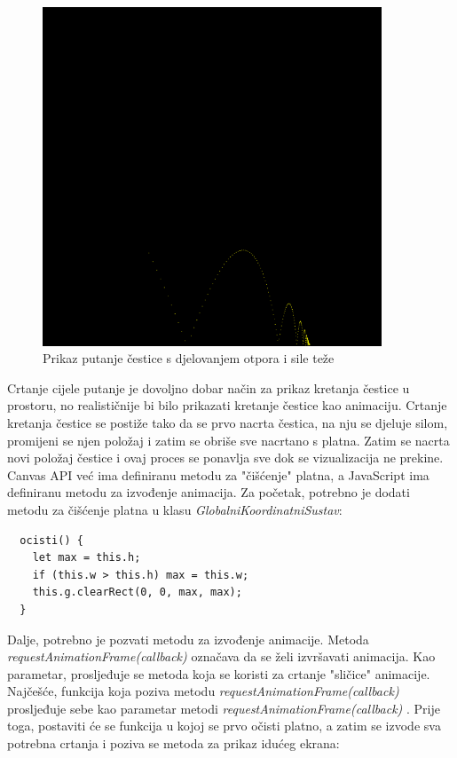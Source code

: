 \documentclass{foi}
\begin{document}
\begin{figure}[H]
    \centering
    \includegraphics[width=0.9\textwidth]{slike/13_PutanjaCesticeOtporSilaTeza.png}
    \captionsetup{justification=centering}
    \caption{Prikaz putanje čestice s djelovanjem otpora i sile teže}
\label{fig:PutanjaCesticeOtporSilaTeza}
\end{figure}

Crtanje cijele putanje je dovoljno dobar način za prikaz kretanja čestice u prostoru, no realističnije bi bilo prikazati kretanje čestice kao animaciju. Crtanje kretanja čestice se postiže tako da se prvo nacrta čestica, na nju se djeluje silom, promijeni se njen položaj i zatim se obriše sve nacrtano s platna. Zatim se nacrta novi položaj čestice i ovaj proces se ponavlja sve dok se vizualizacija ne prekine. Canvas API već ima definiranu metodu za "čišćenje" platna, a JavaScript ima definiranu metodu za izvođenje animacija. Za početak, potrebno je dodati metodu za čišćenje platna u klasu \textit{GlobalniKoordinatniSustav}:

\begin{verbatim}
  ocisti() {
    let max = this.h;
    if (this.w > this.h) max = this.w;
    this.g.clearRect(0, 0, max, max);
  }
\end{verbatim}

Dalje, potrebno je pozvati metodu za izvođenje animacije. Metoda \textit{requestAnimationFrame(callback)} označava da se želi izvršavati animacija. Kao parametar, prosljeđuje se metoda koja se koristi za crtanje "sličice" animacije. Najčešće, funkcija koja poziva metodu \textit{requestAnimationFrame(callback)} prosljeđuje sebe kao parametar metodi \textit{requestAnimationFrame(callback)} \parencite{RequestAnimationFrame}. Prije toga, postaviti će se funkcija u kojoj se prvo očisti platno, a zatim se izvode sva potrebna crtanja i poziva se metoda za prikaz idućeg ekrana:
\end{document}

